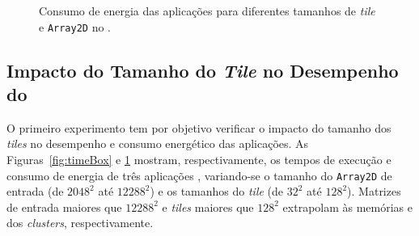\begin{figure}[t]
	\centering
	\quad
    	\quad
	\caption{Consumo de energia das aplicações para diferentes tamanhos de \textit{tile} e \texttt{Array2D} no \mppa.}
	\label{fig:energyBox}
\end{figure}


\subsection{Impacto do Tamanho do \textit{Tile} no Desempenho do \mppa}

O primeiro experimento tem por objetivo verificar o impacto do tamanho dos
\textit{tiles} no desempenho e consumo energético das aplicações. As
Figuras~\ref{fig:timeBox} e \ref{fig:energyBox} mostram, respectivamente, os
tempos de execução e consumo de energia de três aplicações \stencil, variando-se
o tamanho do \texttt{Array2D} de entrada (de $2048^2$ até $12288^2$) e os
tamanhos do \textit{tile} (de $32^2$ até $128^2$). Matrizes de entrada
maiores que $12288^2$ e \textit{tiles} maiores que $128^2$ extrapolam às
memórias \lpddr e dos \textit{clusters}, respectivamente.


